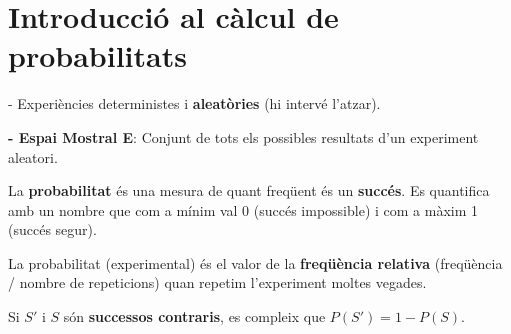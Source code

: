 \newpage

\section{Introducció al càlcul de probabilitats}
\begin{theorybox}

                 - Experiències deterministes i \textbf{aleatòries} (hi intervé l'atzar).                                     
                 
                 \textbf{- Espai Mostral E}: Conjunt de tots els possibles resultats d'un experiment aleatori.

 La \textbf{probabilitat} és una mesura de quant freqüent és un \textbf{succés}. Es quantifica amb un nombre que com a mínim val 0 (succés impossible) i com a màxim 1 (succés segur).

 La probabilitat (experimental) és el valor de la \textbf{freqüència relativa} (freqüència / nombre de repeticions) quan repetim l'experiment moltes vegades.

 Si $S'$ i $S$ són \textbf{successos contraris}, es compleix que $P(S')=1-P(S)$.
\end{theorybox}
                                               
